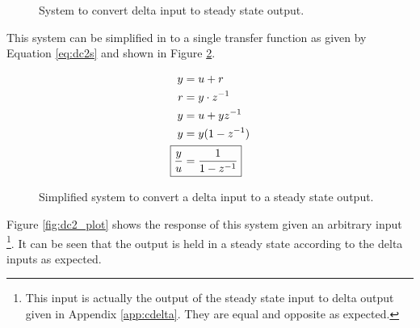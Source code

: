 \documentclass{article}
\begin{document}
\begin{figure}[hpb!]
\begin{center}


\end{center}

\caption{System to convert delta input to steady state output.}
\label{fig:dc1}
\end{figure}

This system can be simplified in to a single transfer function
as given by Equation \ref{eq:dc2s} and shown in Figure \ref{fig:dc1s}.

\begin{align}
	y &= u + r \notag \\
	r &= y \cdot z^{-1} \notag \\
	y &= u + y z^{-1} \notag \\
	y &= y(1 - z^{-1}) \notag \\
	\Aboxed{ \frac{y}{u} &= \frac{1}{1 - z^{-1}} } \label{eq:dc2s}
\end{align}

\begin{figure}[!htbp]
\begin{center}


\end{center}
\caption{Simplified system to convert a delta input to
a steady state output.}
\label{fig:dc1s}
\end{figure}

Figure \ref{fig:dc2_plot} shows the response of this system given
an arbitrary input
\footnote{This input is actually the output of the steady state input
to delta output given in Appendix \ref{app:cdelta}.
They are equal and opposite as expected.}.
It can be seen that the output is held in a steady state according
to the delta inputs as expected.
\end{document}
